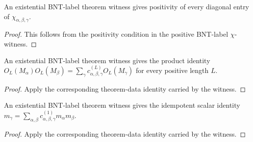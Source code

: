 \begin{theorem}%
    \label{thm:mpdo_bnt_label_theorem_witness_chi_entry_pos}
    \leanok
    An existential BNT-label theorem witness gives positivity of every
    diagonal entry of $\chi_{\alpha,\beta,\gamma}$.
\end{theorem}
\begin{proof}\leanok
    This follows from the positivity condition in the positive BNT-label
    $\chi$-witness.
\end{proof}

\begin{theorem}%
    \label{thm:mpdo_bnt_label_theorem_witness_same_length_product_eq_sum}
    \leanok
    An existential BNT-label theorem witness gives the product identity
    $O_L(M_\alpha)O_L(M_\beta)
        = \sum_\gamma c_{\alpha,\beta,\gamma}^{(L)} O_L(M_\gamma)$
    for every positive length $L$.
\end{theorem}
\begin{proof}\leanok
    Apply the corresponding theorem-data identity carried by the witness.
\end{proof}

\begin{theorem}%
    \label{thm:mpdo_bnt_label_theorem_witness_idempotent_eq_sum}
    \leanok
    An existential BNT-label theorem witness gives the idempotent scalar
    identity
    $m_\gamma =
        \sum_{\alpha,\beta} c_{\alpha,\beta,\gamma}^{(1)}m_\alpha m_\beta$.
\end{theorem}
\begin{proof}\leanok
    Apply the corresponding theorem-data identity carried by the witness.
\end{proof}

